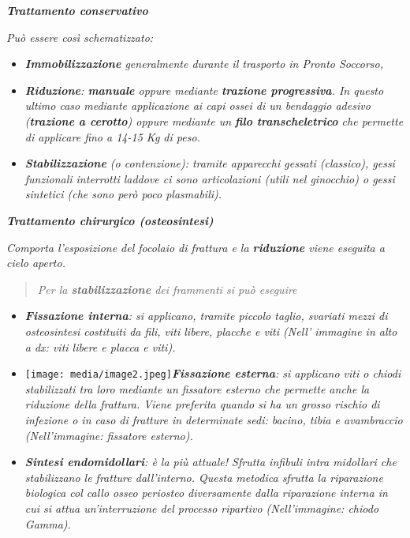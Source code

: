 \documentclass[]{article}
\begin{document}
\textbf{\emph{Trattamento conservativo}}

\emph{Può essere così schematizzato:}

\begin{itemize}
\item
  \emph{\textbf{Immobilizzazione} generalmente durante il trasporto in
  Pronto Soccorso, }
\item
  \emph{\textbf{Riduzione}: \textbf{manuale} oppure mediante
  \textbf{trazione progressiva}. In questo ultimo caso mediante
  applicazione ai capi ossei di un bendaggio adesivo (\textbf{trazione a
  cerotto}) oppure mediante un \textbf{filo transcheletrico} che
  permette di applicare fino a 14-15 Kg di peso.}
\item
  \emph{\textbf{Stabilizzazione} (o contenzione): tramite apparecchi
  gessati (classico), gessi funzionali interrotti laddove ci sono
  articolazioni (utili nel ginocchio) o gessi sintetici (che sono però
  poco plasmabili).}
\end{itemize}

\textbf{\emph{Trattamento chirurgico (osteosintesi)}}

\emph{Comporta l'esposizione del focolaio di frattura e la
\textbf{riduzione} viene eseguita a cielo aperto.}

\begin{quote}
\emph{Per la \textbf{stabilizzazione} dei frammenti si può eseguire}
\end{quote}

\begin{itemize}
\item
  \emph{\textbf{Fissazione interna}: si applicano, tramite piccolo
  taglio, svariati mezzi di osteosintesi costituiti da fili, viti
  libere, placche e viti (Nell' immagine in alto a dx: viti libere e
  placca e viti).}
\item
  \texttt{[image: media/image2.jpeg]}\emph{\textbf{Fissazione
  esterna}: si applicano viti o chiodi stabilizzati tra loro mediante un
  fissatore esterno che permette anche la riduzione della frattura.
  Viene preferita quando si ha un grosso rischio di infezione o in caso
  di fratture in determinate sedi: bacino, tibia e avambraccio
  (Nell'immagine: fissatore esterno).}
\item
  \emph{\textbf{Sintesi endomidollari}: è la più attuale! Sfrutta
  infibuli intra midollari che stabilizzano le fratture dall'interno.
  Questa metodica sfrutta la riparazione biologica col callo osseo
  periosteo diversamente dalla riparazione interna in cui si attua
  un'interruzione del processo ripartivo (Nell'immagine: chiodo Gamma).}
\end{itemize}
\end{document}
